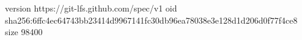 version https://git-lfs.github.com/spec/v1
oid sha256:6ffc4ec64743bb23414d9967141fc30db96ea78038e3e128d1d206d0f77f4ce8
size 98400
